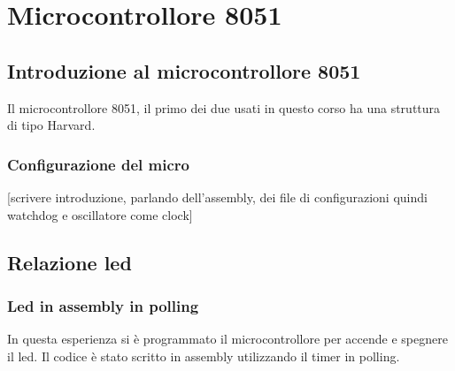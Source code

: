 \documentclass[main.tex]{subfiles}
\begin{document}
\chapter{Microcontrollore 8051}

\section{Introduzione al microcontrollore 8051}
Il microcontrollore 8051, il primo dei due usati in questo corso ha una struttura di tipo Harvard. 

\subsection{Configurazione del micro}
[scrivere introduzione, parlando dell’assembly, dei file di configurazioni quindi watchdog e oscillatore come clock]

\section{Relazione led}
\subsection{Led in assembly in polling}

In questa esperienza si è programmato il microcontrollore per accende e spegnere il led. Il codice è stato scritto in assembly utilizzando il timer in polling.
\end{document}
